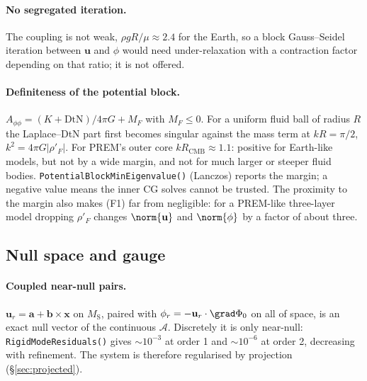 \documentclass[11pt]{article}
\numberwithin{equation}{section}
\theoremstyle{remark}
\newcommand{\DtN}{\mathrm{DtN}}
\newcommand{\vu}{\mathbf{u}}
\newcommand{\vx}{\mathbf{x}}
\newcommand{\MS}{M_{\mathrm{S}}}
\newcommand{\code}[1]{\texttt{#1}}
\begin{document}
\paragraph{No segregated iteration.} The coupling is not weak,
$\rho g R/\mu \approx 2.4$ for the Earth, so a block Gauss--Seidel iteration
between $\vu$ and $\phi$ would need under-relaxation with a contraction
factor depending on that ratio; it is not offered.

\paragraph{Definiteness of the potential block.} $A_{\phi\phi} = (K +
\DtN)/4\pi G + M_F$ with $M_F \le 0$. For a uniform fluid ball of radius
$R$ the Laplace--DtN part first becomes singular against the mass term at
$kR = \pi/2$, $k^2 = 4\pi G|\rho'_F|$. For PREM's outer core
$k R_{\mathrm{CMB}} \approx 1.1$: positive for Earth-like models, but not
by a wide margin, and not for much larger or steeper fluid bodies.
\code{PotentialBlockMinEigenvalue()} (Lanczos) reports the margin; a
negative value means the inner CG solves cannot be trusted. The proximity
to the margin also makes (F1) far from negligible: for a PREM-like
three-layer model dropping $\rho'_F$ changes $\norm{\vu}$ and
$\norm{\phi}$ by a factor of about three.

\subsection{Null space and gauge}
\label{sec:mixed-null}

\paragraph{Coupled near-null pairs.} $\vu_r = \mathbf{a} + \mathbf{b}\times
\vx$ on $\MS$, paired with $\phi_r = -\vu_r\cdot\grad\Phi_0$ on all of space,
is an exact null vector of the continuous $\mathcal{A}$. Discretely it is
only near-null: \code{RigidModeResiduals()} gives $\sim10^{-3}$ at order 1
and $\sim10^{-6}$ at order 2, decreasing with refinement. The system is
therefore regularised by projection (\S\ref{sec:projected}).
\end{document}
